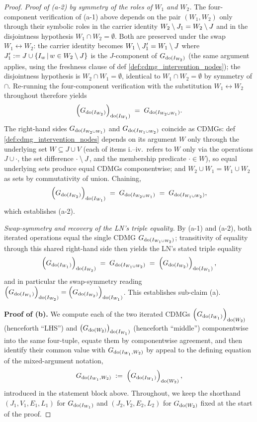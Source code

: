 \documentclass[main]{subfiles}
\begin{document}
\begin{proof}
\medskip\noindent\emph{Proof of (a-2) by symmetry of the roles of $W_1$ and $W_2$.}
The four-component verification of (a-1) above depends on the pair $(W_1, W_2)$ only through their symbolic roles in the carrier identity $W_2 \setminus J_1 = W_2 \setminus J$ and in the disjointness hypothesis $W_1 \cap W_2 = \emptyset$. Both are preserved under the swap $W_1 \leftrightarrow W_2$: the carrier identity becomes $W_1 \setminus J_1' = W_1 \setminus J$ where $J_1' := J \cup \left \{ I_w \,\middle|\, w \in W_2 \setminus J \right \}$ is the $J$-component of $G_{\operatorname{do}(I_{W_2})}$ (the same argument applies, using the freshness clause of def \ref{def:cdmg_intervention_nodes}); the disjointness hypothesis is $W_2 \cap W_1 = \emptyset$, identical to $W_1 \cap W_2 = \emptyset$ by symmetry of $\cap$. Re-running the four-component verification with the substitution $W_1 \leftrightarrow W_2$ throughout therefore yields
\[
    \left ( G_{\operatorname{do}(I_{W_2})} \right )_{\operatorname{do}(I_{W_1})} \;=\; G_{\operatorname{do}(I_{W_2 \cup W_1})}.
\]
The right-hand sides $G_{\operatorname{do}(I_{W_2 \cup W_1})}$ and $G_{\operatorname{do}(I_{W_1 \cup W_2})}$ coincide as CDMGs: def \ref{def:cdmg_intervention_nodes} depends on its argument $W$ only through the underlying set $W \subseteq J \cup V$ (each of items i.--iv.\ refers to $W$ only via the operations $J \cup \cdot$, the set difference $\cdot \setminus J$, and the membership predicate $\cdot \in W$), so equal underlying sets produce equal CDMGs componentwise; and $W_2 \cup W_1 = W_1 \cup W_2$ as sets by commutativity of union. Chaining,
\[
    \left ( G_{\operatorname{do}(I_{W_2})} \right )_{\operatorname{do}(I_{W_1})} \;=\; G_{\operatorname{do}(I_{W_2 \cup W_1})} \;=\; G_{\operatorname{do}(I_{W_1 \cup W_2})},
\]
which establishes (a-2).

\medskip\noindent\emph{Swap-symmetry and recovery of the LN's triple equality.}
By (a-1) and (a-2), both iterated operations equal the single CDMG $G_{\operatorname{do}(I_{W_1 \cup W_2})}$; transitivity of equality through this shared right-hand side then yields the LN's stated triple equality
\[
    \left ( G_{\operatorname{do}(I_{W_1})} \right )_{\operatorname{do}(I_{W_2})} \;=\; G_{\operatorname{do}(I_{W_1 \cup W_2})} \;=\; \left ( G_{\operatorname{do}(I_{W_2})} \right )_{\operatorname{do}(I_{W_1})},
\]
and in particular the swap-symmetry reading $\left ( G_{\operatorname{do}(I_{W_1})} \right )_{\operatorname{do}(I_{W_2})} = \left ( G_{\operatorname{do}(I_{W_2})} \right )_{\operatorname{do}(I_{W_1})}$. This establishes sub-claim (a).

\medskip\noindent\textbf{Proof of (b).}
We compute each of the two iterated CDMGs $\left ( G_{\operatorname{do}(I_{W_1})} \right )_{\operatorname{do}(W_2)}$ (henceforth ``LHS'') and $\left ( G_{\operatorname{do}(W_2)} \right )_{\operatorname{do}(I_{W_1})}$ (henceforth ``middle'') componentwise into the same four-tuple, equate them by componentwise agreement, and then identify their common value with $G_{\operatorname{do}(I_{W_1}, W_2)}$ by appeal to the defining equation of the mixed-argument notation,
\[
    G_{\operatorname{do}(I_{W_1}, W_2)} \;:=\; \left ( G_{\operatorname{do}(I_{W_1})} \right )_{\operatorname{do}(W_2)},
\]
introduced in the statement block above. Throughout, we keep the shorthand $(J_1, V_1, E_1, L_1)$ for $G_{\operatorname{do}(I_{W_1})}$ and $(J_2, V_2, E_2, L_2)$ for $G_{\operatorname{do}(W_2)}$ fixed at the start of the proof.


\end{proof}
\end{document}
